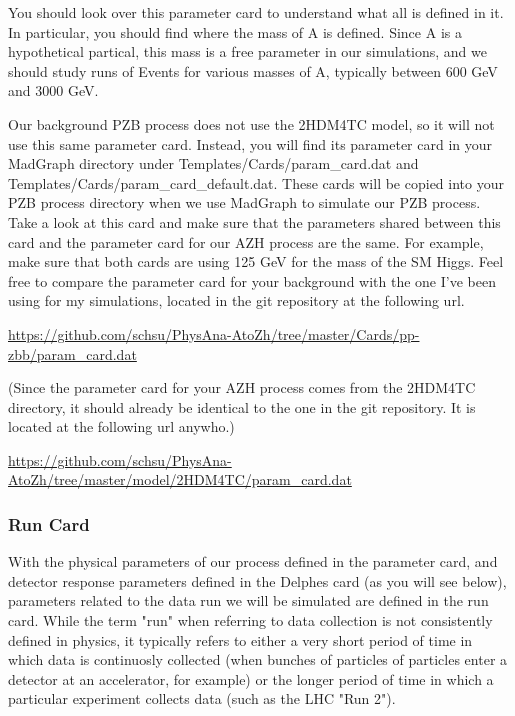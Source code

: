 \documentclass{article}
\begin{document}
\bigskip

You should look over this parameter card to understand what all is defined in it. In
particular, you should find where the mass of A is defined. Since A is a hypothetical partical, this mass is a free parameter
in our simulations, and we should study runs of Events for various masses of A, typically between 600 GeV and 3000 GeV.

\bigskip

Our background PZB process does not use the 2HDM4TC model, so it will not use this same parameter card. Instead, you will
find its parameter card in your MadGraph directory under Templates/Cards/param\_card.dat and Templates/Cards/param\_card\_default.dat.
These cards will be copied into your PZB process directory when we use MadGraph to simulate our PZB process. Take a look at this card
and make sure that the parameters shared between this card and the parameter card for our AZH process are the same. For example,
make sure that both cards are using 125 GeV for the mass of the SM Higgs.
Feel free to compare the parameter card for your background with the one I've been using for my simulations, located in the git repository at the following url.

\bigskip

\url{https://github.com/schsu/PhysAna-AtoZh/tree/master/Cards/pp-zbb/param_card.dat}

\bigskip

(Since the parameter card for your AZH process comes from the 2HDM4TC directory, it should already be identical to the one in the git repository.
It is located at the following url anywho.)

\bigskip

\url{https://github.com/schsu/PhysAna-AtoZh/tree/master/model/2HDM4TC/param_card.dat}

\subsubsection{Run Card}
\label{sec:runCard}

With the physical parameters of our process defined in the parameter card, and detector response parameters defined in the Delphes card (as you will see below),
parameters related to the data run we will be simulated are defined in the run card. While the term "run" when referring to data collection
is not consistently defined in physics, it typically refers to either a very short period of time in which data is continuosly collected (when bunches
of particles of particles enter a detector at an accelerator, for example) or the longer period of time in which a particular experiment collects data
(such as the LHC "Run 2").
\end{document}
